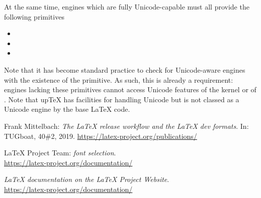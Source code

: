 \documentclass{ltnews}
\begin{document}
At the same time, engines which are fully Unicode-capable must all
provide the following primitives
%
\begingroup\setlength\columnsep{0pt}
\begin{multicols}{2}
\begin{itemize}
  \item {}
  \item {}
  \item {}
\end{itemize}
\end{multicols}
\endgroup
%
Note that it has become standard practice to check for Unicode-aware
engines with the existence of the  primitive. As such,
this is already a requirement: engines lacking these primitives cannot
access Unicode features of the \LaTeXe{} kernel or of
. Note that up\TeX{} has facilities for handling Unicode
but is not classed as a Unicode engine by the base LaTeX code.

\begin{thebibliography}{9}


 Frank Mittelbach:
  \emph{The
  \LaTeX{} release workflow and the \LaTeX{} dev formats}.
  In: TUGboat, 40\#2, 2019.
  \url{https://latex-project.org/publications/}

 \LaTeX{} Project Team:
  \emph{\LaTeXe{} font selection}.\\
  \url{https://latex-project.org/documentation/}

  \emph{\LaTeX{} documentation on the \LaTeX{} Project Website}.\\
  \url{https://latex-project.org/documentation/}

\end{thebibliography}
\end{document}
